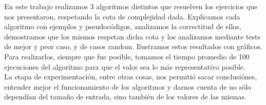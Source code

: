En este trabajo realizamos 3 algoritmos distintos que resuelven los ejercicios que nos presentaron, respetando la cota de complejidad dada. Explicamos cada algoritmo con ejemplos y pseudocódigos, analizamos la correctitud de ellos, demostramos que los mismos respetan dicha cota y los analizamos mediante tests de mejor y peor caso, y de casos random. Ilustramos estos resultados con gráficos. Para realizarlos, siempre que fue posible, tomamos el tiempo promedio de 100 ejecuciones del algoritmo para que el valor sea lo más representativo posible. \\
La etapa de experimentación, entre otras cosas, nos permitió sacar conclusiónes, entender mejor el funcionamiento de los algoritmos y darnos cuenta de no sólo dependían del tamaño de entrada, sino también de los valores de las mismas.   

